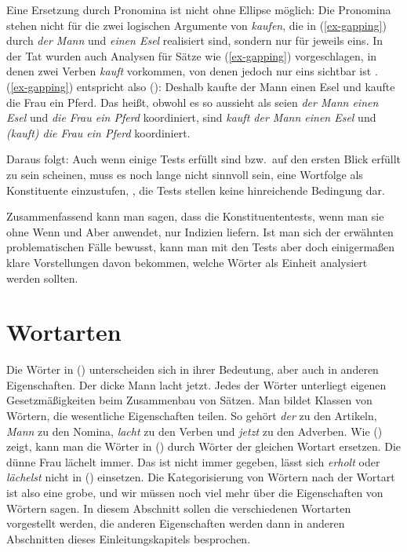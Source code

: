 \documentclass[ number=45
			   ,series=eotms
			   ,printondemand
			  ]{langsci}
\begin{document}
{\noindent
Eine Ersetzung durch Pronomina ist nicht ohne Ellipse möglich:
\eal
{}
\zl
Die Pronomina stehen nicht für die zwei logischen Argumente von \emph{kaufen}, die
in (\ref{ex-gapping})  \zb durch \emph{der Mann} und \emph{einen Esel} realisiert sind,
sondern nur für jeweils eins. In der Tat wurden auch Analysen für Sätze wie (\ref{ex-gapping}) vorgeschlagen,
in denen zwei Verben \emph{kauft} vorkommen, von denen jedoch nur eins sichtbar
ist \citep{Crysmann2003c}. (\ref{ex-gapping}) entspricht also ():
\ea
Deshalb kaufte der Mann einen Esel und kaufte die Frau ein Pferd.
\z
Das heißt, obwohl es so aussieht als seien \emph{der Mann einen Esel} und \emph{die Frau ein Pferd}
koordiniert, sind \emph{kauft der Mann einen Esel} und \emph{(kauft) die Frau ein Pferd} koordiniert.

Daraus folgt: Auch wenn einige Tests erfüllt sind bzw.\ auf den ersten Blick erfüllt zu sein
scheinen, muss es noch lange nicht sinnvoll sein, eine Wortfolge als Konstituente einzustufen, \dash,
die Tests stellen keine hinreichende Bedingung dar.



Zusammenfassend kann man sagen, dass die Konstituententests, wenn man sie ohne Wenn und Aber
anwendet, nur Indizien liefern. Ist man sich der erwähnten problematischen Fälle bewusst,
kann man mit den Tests aber doch einigermaßen klare Vorstellungen davon bekommen, welche
Wörter als Einheit analysiert werden sollten.



\section{Wortarten}
\label{Abschnitt-Wortarten}

Die Wörter in () unterscheiden sich in ihrer Bedeutung, aber auch in anderen Eigenschaften.
\ea
Der dicke Mann lacht jetzt.
\z
Jedes der Wörter unterliegt eigenen Gesetzmäßigkeiten beim Zusammenbau von Sätzen. Man bildet
Klassen von Wörtern, die wesentliche Eigenschaften teilen. So gehört \emph{der} zu den Artikeln,
\emph{Mann} zu den Nomina, \emph{lacht} zu den Verben und \emph{jetzt} zu den
Adverben. Wie () zeigt, kann man die Wörter in () durch Wörter der gleichen
Wortart ersetzen.
\ea
Die dünne Frau lächelt immer.
\z
Das ist nicht immer gegeben, \zb lässt sich \emph{erholt} oder \emph{lächelst} nicht in ()
einsetzen. Die Kategorisierung von Wörtern nach der Wortart ist also eine grobe, und wir müssen
noch viel mehr über die Eigenschaften von Wörtern sagen. In diesem Abschnitt sollen die
verschiedenen Wortarten vorgestellt werden, die anderen Eigenschaften werden dann in anderen
Abschnitten dieses Einleitungskapitels besprochen.

}
\end{document}
